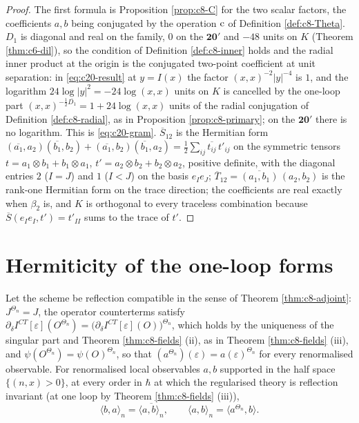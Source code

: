 \begin{proof}
The first formula is Proposition \ref{prop:c8-C} for the two scalar factors, the coefficients $a,b$ being conjugated by the operation ${\rm c}$ of Definition \ref{def:c8-Theta}. $D_1$ is diagonal and real on the family, $0$ on the $\mathbf{20'}$ and $-48$ units on $K$ (Theorem \ref{thm:c6-dil}), so the condition of Definition \ref{def:c8-inner} holds and the radial inner product at the origin is the conjugated two-point coefficient at unit separation: in \eqref{eq:c20-result} at $y=I(x)$ the factor $(x,x)^{-2}|y|^{-4}$ is $1$, and the logarithm $24\log|y|^2=-24\log(x,x)$ units on $K$ is cancelled by the one-loop part $(x,x)^{-\frac12\overline{D_1}}=1+24\log(x,x)$ units of the radial conjugation of Definition \ref{def:c8-radial}, as in Proposition \ref{prop:c8-primary}; on the $\mathbf{20'}$ there is no logarithm. This is \eqref{eq:c20-gram}. $\overline S_{12}$ is the Hermitian form $(\overline{a_1},a_2)(\overline{b_1},b_2)+(\overline{a_1},b_2)(\overline{b_1},a_2)=\tfrac12\sum_{ij}\overline{t_{ij}}\,t'_{ij}$ on the symmetric tensors $t=a_1\otimes b_1+b_1\otimes a_1$, $t'=a_2\otimes b_2+b_2\otimes a_2$, positive definite, with the diagonal entries $2$ ($I=J$) and $1$ ($I<J$) on the basis $e_Ie_J$; $\overline T_{12}=\overline{(a_1,b_1)}\,(a_2,b_2)$ is the rank-one Hermitian form on the trace direction; the coefficients are real exactly when $\beta_2$ is, and $K$ is orthogonal to every traceless combination because $\overline S(e_Ie_I,t')=t'_{II}$ sums to the trace of $t'$.
\end{proof}

\section{Hermiticity of the one-loop forms}

\begin{proposition}
\label{prop:c20-herm}
Let the scheme be reflection compatible in the sense of Theorem \ref{thm:c8-adjoint}: $J^{\Theta_n}=J$, the operator counterterms satisfy $\partial_\delta I^{CT}[\varepsilon](O^{\Theta_n})=\big(\partial_\delta I^{CT}[\varepsilon](O)\big)^{\Theta_n}$, which holds by the uniqueness of the singular part and Theorem \ref{thm:c8-fields} (ii), as in Theorem \ref{thm:c8-fields} (iii), and $\psi(O^{\Theta_n})=\psi(O)^{\Theta_n}$, so that $(a^{\Theta_n})(\varepsilon)=a(\varepsilon)^{\Theta_n}$ for every renormalised observable. For renormalised local observables $a,b$ supported in the half space $\{(n,x)>0\}$, at every order in $\hbar$ at which the regularised theory is reflection invariant (at one loop by Theorem \ref{thm:c8-fields} (iii)),
\[
\langle b,a\rangle_n=\overline{\langle a,b\rangle_n},\qquad \langle a,b\rangle_n=\big\langle a^{\Theta_n},b\big\rangle .
\]
\end{proposition}

